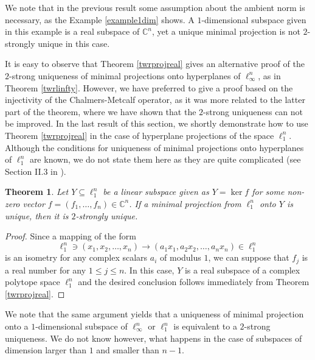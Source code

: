 \documentclass[12pt, reqno]{amsart}
\newtheorem{twr}{Theorem}[section]
\theoremstyle{definition}
\theoremstyle{remark}
\numberwithin{equation}{section}
\begin{document}
We note that in the previous result some assumption about the ambient norm is necessary, as the Example \ref{example1dim} shows. A $1$-dimensional subspace given in this example is a real subspace of $\mathbb{C}^n$, yet a unique minimal projection is not $2$-strongly unique in this case.

It is easy to observe that Theorem \ref{twrprojreal} gives an alternative proof of the $2$-strong uniqueness of minimal projections onto hyperplanes of $\ell_{\infty}^n$, as in Theorem \ref{twrlinfty}. However, we have preferred to give a proof based on the injectivity of the Chalmers-Metcalf operator, as it was more related to the latter part of the theorem, where we have shown that the $2$-strong uniqueness can not be improved. In the last result of this section, we shortly demonstrate how to use Theorem \ref{twrprojreal} in the case of hyperplane projections of the space $\ell_1^n$. Although the conditions for uniqueness of minimal projections onto hyperplanes of $\ell_1^n$ are known, we do not state them here as they are quite complicated (see Section II.3 in \cite{lewickihabilitacja}).

\begin{twr}
\label{twrl1proj}
Let $Y \subseteq \ell_{1}^n$ be a linear subspace given as $Y=\ker f$ for some non-zero vector $f=(f_1, \ldots, f_n) \in \mathbb{C}^n$. If a minimal projection from $\ell_{1}^n$ onto $Y$ is unique, then it is $2$-strongly unique.
\end{twr}

\begin{proof}
Since a mapping of the form
$$\ell_{1}^n \ni (x_1, x_2, \ldots, x_n) \to (a_1x_1, a_2x_2, \ldots, a_nx_n) \in \ell_{1}^n$$
is an isometry for any complex scalars $a_i$ of modulus $1$, we can suppose that $f_j$ is a real number for any $1 \leq j \leq n$. In this case, $Y$ is a real subspace of a complex polytope space $\ell_1^n$ and the desired conclusion follows immediately from Theorem \ref{twrprojreal}.
\end{proof}

We note that the same argument yields that a uniqueness of minimal projection onto a $1$-dimensional subspace of $\ell_{\infty}^n$ or $\ell_1^n$ is equivalent to a $2$-strong uniqueness. We do not know however, what happens in the case of subspaces of dimension larger than $1$ and smaller than $n-1$.
\end{document}
